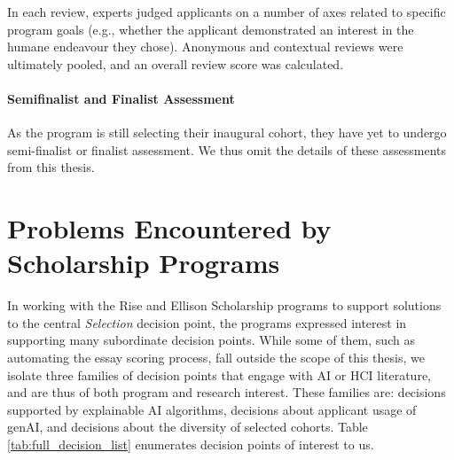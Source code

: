 In each review, experts judged applicants on a number of axes related to specific program goals (e.g., whether the applicant demonstrated an interest in the humane endeavour they chose). Anonymous and contextual reviews were ultimately pooled, and an overall review score was calculated.

\paragraph{Semifinalist and Finalist Assessment}
As the program is still selecting their inaugural cohort, they have yet to undergo semi-finalist or finalist assessment. We thus omit the details of these assessments from this thesis.

\section{Problems Encountered by Scholarship Programs}
In working with the Rise and Ellison Scholarship programs to support solutions to the central \emph{Selection} decision point, the programs expressed interest in supporting many subordinate decision points. While some of them, such as automating the essay scoring process, fall outside the scope of this thesis, we isolate three families of decision points that engage with AI or HCI literature, and are thus of both program and research interest. These families are: decisions supported by explainable AI algorithms, decisions about applicant usage of genAI, and decisions about the diversity of selected cohorts. Table \ref{tab:full_decision_list} enumerates decision points of interest to us. 

